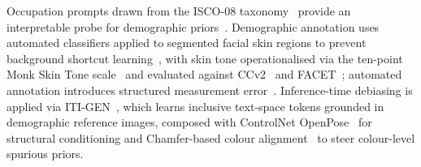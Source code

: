 Occupation prompts drawn from the ISCO-08 taxonomy~\cite{ILO_ISCO08} provide an
interpretable probe for demographic
priors~\cite{Naik_2023_SocialBiasesThroughTheTextToImageGenerationLens,
    Bianchi_2023_TTIGenAmplifiesDemographicStereotypes,
    Luccioni_2023_AnalyzingSocietalRepresentationsDiffusionModels}. Demographic annotation
uses automated classifiers applied to segmented facial skin regions to prevent background
shortcut learning~\cite{Matias_2024_EnhancingFairnessMST}, with skin tone operationalised
via the ten-point Monk Skin Tone scale~\cite{Schumann_2024_MonkSkinTone} and evaluated
against CCv2~\cite{Porgali_2023_CCv2} and FACET~\cite{Gustafson_2023_FACET}; automated
annotation introduces structured measurement error~\cite{Buolamwini_2018_GenderShades}.
Inference-time debiasing is applied via ITI-GEN~\cite{Zhang_2023_ITIGEN}, which learns
inclusive text-space tokens grounded in demographic reference images, composed with
ControlNet OpenPose~\cite{LZhang_2023_ControlNet} for structural conditioning and
Chamfer-based colour alignment~\cite{Shum_2025_ColorAlignment} to steer colour-level
spurious priors.